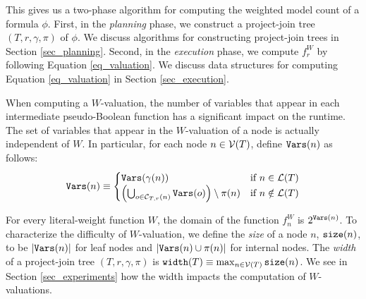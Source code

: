This gives us a two-phase algorithm for computing the weighted model count of a formula $\phi$.
First, in the \emph{planning} phase, we construct a project-join tree $(T, r, \gamma, \pi)$ of $\phi$.
We discuss algorithms for constructing project-join trees in Section \ref{sec_planning}.
Second, in the \emph{execution} phase, we compute $f^W_r$ by following Equation \eqref{eq_valuation}.
We discuss data structures for computing Equation \eqref{eq_valuation} in Section \ref{sec_execution}.

When computing a $W$-valuation, the number of variables that appear in each intermediate pseudo-Boolean function has a significant impact on the runtime.
The set of variables that appear in the $W$-valuation of a node is actually independent of $W$.
In particular, for each node $n \in \mathcal{V}(T)$, define $\texttt{\upshape Vars}(n)$ as follows:
\begin{equation}
    \texttt{\upshape Vars}(n) \equiv
    \begin{cases}
        \texttt{\upshape Vars}(\gamma(n)) & \text{if}~n \in \mathcal{L}(T) \\
        \left( \bigcup_{o \in \mathcal{C}_{T,r}(n)} \texttt{\upshape Vars}(o) \right) \setminus \pi(n) & \text{if}~n \notin \mathcal{L}(T)
    \end{cases}
\end{equation}

For every literal-weight function $W$, the domain of the function $f^W_n$ is $2^{\texttt{\upshape Vars}(n)}$.
To characterize the difficulty of $W$-valuation, we define the \emph{size} of a node $n$, $\texttt{\upshape size}(n)$, to be $\left| \texttt{\upshape Vars}(n) \right|$ for leaf nodes and $\left| \texttt{\upshape Vars}(n) \cup \pi(n) \right|$ for internal nodes.
The \emph{width} of a project-join tree $(T, r, \gamma, \pi)$ is $\texttt{\upshape width}(T) \equiv \max_{n \in \mathcal{V}(T)} \texttt{\upshape size}(n)$.
We see in Section \ref{sec_experiments} how the width impacts the computation of $W$-valuations.




